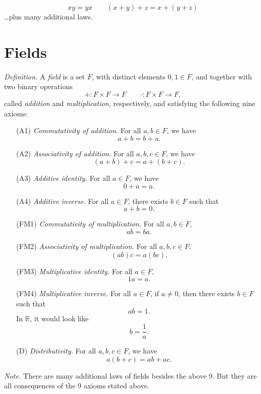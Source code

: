 \documentclass[11pt]{article}
\begin{document}
    \[xy = yx \qquad (x+y)+z = x+(y+z)\] \dots plus many additional laws.

    \pagebreak

    \section{Fields}

    \emph{Definition.} A \emph{field} is a set $F$, with distinct elements \(0,1 \in F\), and together with two binary operations \[+ : F \times F \rightarrow F \qquad \cdot : F \times F \rightarrow F,\] called \emph{addition} and \emph{multiplication}, respectively, and satisfying the following nine axioms:
    \begin{enumerate}
        \item[(A1)] \emph{Commutativity of addition.} For all \(a,b \in F\), we have \[a + b = b + a.\]
        \item[(A2)] \emph{Associativity of addition.} For all \(a,b,c \in F\), we have \[(a + b) + c = a + (b + c).\]
        \item[(A3)] \emph{Additive identity.} For all \(a \in F\), we have \[0 + a = a.\]
        \item[(A4)] \emph{Additive inverse.} For all \(a \in F\), there exists \(b \in F\) such that \[a + b = 0.\]
        \item[(FM1)] \emph{Commutativity of multiplication.} For all \(a,b \in F\), \[ab = ba.\]
        \item[(FM2)] \emph{Associativity of multiplication.} For all \(a,b,c \in F\), \[(ab)c = a(bc).\]
        \item[(FM3)] \emph{Multiplicative identity.} For all \(a \in F,\) \[1a = a.\]
        \item[(FM4)] \emph{Multiplicative inverse.} For all \(a \in F\), if \(a \neq 0\), then there exists \(b \in F\) such that \[ab = 1.\] In \(\mathbb{R}\), it would look like \[b = \frac{1}{a}.\]  
        \item[(D)] \emph{Distributivity.} For all \(a,b,c \in F\), we have \[a (b + c) = ab + ac.\]    
    \end{enumerate}
    \emph{Note.} There are many additional laws of fields besides the above 9. But they are all consequences of the 9 axioms stated above.

    \vspace{1em}
\end{document}
